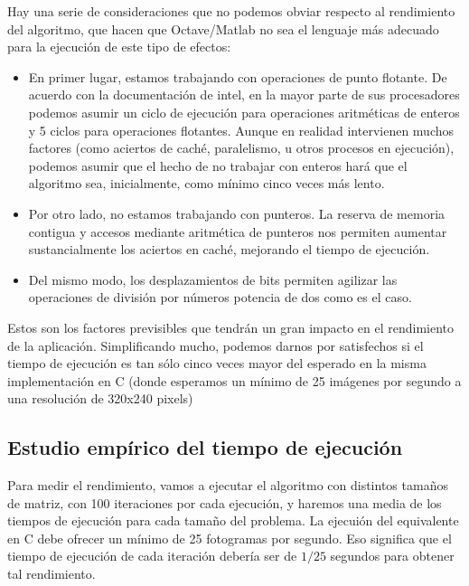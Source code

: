 \documentclass[a4,12pt]{article}
\begin{document}
Hay una serie de consideraciones que no podemos obviar respecto al rendimiento del algoritmo, que hacen que Octave/Matlab no sea el lenguaje más adecuado para la ejecución de este tipo de efectos:

\begin{itemize}
\item En primer lugar, estamos trabajando con operaciones de punto flotante. De acuerdo con la documentación de intel, en la mayor parte de sus procesadores podemos asumir un ciclo de ejecución para operaciones aritméticas de enteros y 5 ciclos para operaciones flotantes.\cite{intelLatency} Aunque en realidad intervienen muchos factores (como aciertos de caché, paralelismo, u otros procesos en ejecución), podemos asumir que el hecho de no trabajar con enteros hará que el algoritmo sea, inicialmente, como mínimo cinco veces más lento.
\item Por otro lado, no estamos trabajando con punteros. La reserva de memoria contigua y accesos mediante aritmética de punteros nos permiten aumentar sustancialmente los aciertos en caché, mejorando el tiempo de ejecución.
\item Del mismo modo, los desplazamientos de bits permiten agilizar las operaciones de división por números potencia de dos como es el caso.
\end{itemize}

Estos son los factores previsibles que tendrán un gran impacto en el rendimiento de la aplicación. Simplificando mucho, podemos darnos por satisfechos si el tiempo de ejecución es tan sólo cinco veces mayor del esperado en la misma implementación en C (donde esperamos un mínimo de 25 imágenes por segundo a una resolución de 320x240 pixels)

\subsection{Estudio empírico del tiempo de ejecución}

Para medir el rendimiento, vamos a ejecutar el algoritmo con distintos tamaños de matriz, con 100 iteraciones por cada ejecución, y haremos una media de los tiempos de ejecución para cada tamaño del problema.
\newline
\newline
La ejecuión del equivalente en C debe ofrecer un mínimo de 25 fotogramas por segundo. Eso significa que el tiempo de ejecución de cada iteración debería ser de \(1/25\) segundos para obtener tal rendimiento.
\end{document}
